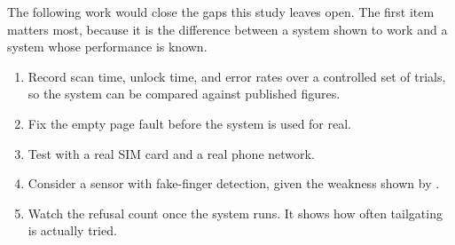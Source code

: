 
The following work would close the gaps this study leaves open. The first item matters most, because it is the difference between a system shown to work and a system whose performance is known.

\begin{enumerate}
  \item Record scan time, unlock time, and error rates over a controlled set
        of trials, so the system can be compared against published figures.
  \item Fix the empty page fault before the system is used for real.
  \item Test with a real SIM card and a real phone network.
  \item Consider a sensor with fake-finger detection, given the weakness shown
        by \textcite{rad2024}.
  \item Watch the refusal count once the system runs. It shows how often
        tailgating is actually tried.
\end{enumerate}
